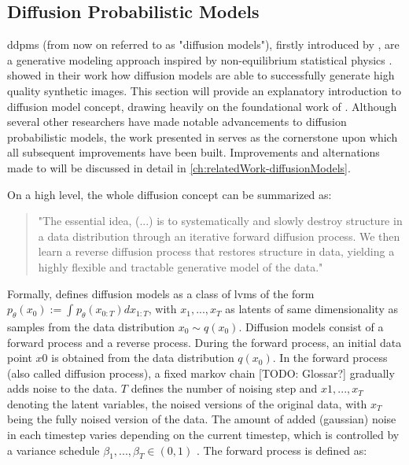 \subsection{Diffusion Probabilistic Models}
\label{ch:preliminaries-generativeAlgorithms-diffusionProbabilisticModels}

\Glspl{ddpm} (from now on referred to as "diffusion models"), firstly introduced by \cite{sohl-dickstein2015DeepUnsupervisedLearning}, are a generative modeling approach inspired by non-equilibrium statistical physics \cite{sohl-dickstein2015DeepUnsupervisedLearning}.
\cite{ho2020DenoisingDiffusionProbabilistic} showed in their work how diffusion models are able to successfully generate high quality synthetic images.
This section will provide an explanatory introduction to diffusion model concept, drawing heavily on the foundational work of \cite{ho2020DenoisingDiffusionProbabilistic}.
Although several other researchers have made notable advancements to  diffusion probabilistic models, the work presented in \cite{ho2020DenoisingDiffusionProbabilistic} 
serves as the cornerstone upon which all subsequent improvements have been built.
Improvements and alternations made to \cite{ho2020DenoisingDiffusionProbabilistic} will be discussed in detail in \autoref{ch:relatedWork-diffusionModels}.

On a high level, the whole diffusion concept can be summarized as:

\begin{quotation}
  "The essential idea, (...) is to systematically and slowly destroy structure in a data distribution through an iterative forward diffusion process. 
  We then learn a reverse diffusion process that restores structure in data, yielding a highly flexible and tractable generative model of the data." \cite[p. 1]{sohl-dickstein2015DeepUnsupervisedLearning}
\end{quotation}

Formally, \cite{ho2020DenoisingDiffusionProbabilistic} defines diffusion models as a class of \glspl{lvm} of the form $p_\theta(x_0):= \int_{}^{}p_\theta(x_{0:T})dx_{1:T}$,
with $x_1, ..., x_T$ as latents of same dimensionality as samples from the data distribution $x_0 \sim q(x_0)$.
Diffusion models consist of a forward process and a reverse process.
During the forward process, an initial data point $x0$ is obtained from the data distribution $q(x_0)$.
In the forward process (also called diffusion process), a fixed markov chain [TODO: Glossar?] gradually adds noise to the data.
$T$ defines the number of noising step and $x1,...,x_T$ denoting the latent variables, \ie the noised versions of the original data, with $x_T$ being the fully noised version of the data.
The amount of added (gaussian) noise in each timestep varies depending on the current timestep, which is controlled by a variance schedule $\beta_1, ..., \beta_T \in (0,1)$ \cite{ho2020DenoisingDiffusionProbabilistic}.
The forward process is defined as:

